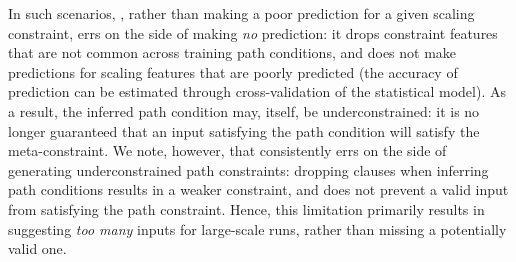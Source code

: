 In such scenarios, \lancet, rather than making a poor prediction for a given scaling constraint, errs on the side of making {\em no} prediction: it drops constraint features that are not common across training path conditions, and does not make predictions for scaling features that are poorly predicted (the accuracy of prediction can be estimated through cross-validation of the statistical model). As a result, the inferred path condition may, itself, be underconstrained: it is no longer guaranteed that an input satisfying the path condition will satisfy the meta-constraint. We note, however, that \lancet consistently errs on the side of generating underconstrained path constraints: dropping clauses when inferring path conditions results in a weaker constraint, and does not prevent a valid input from satisfying the path constraint. Hence, this limitation primarily results in \lancet suggesting {\em too many} inputs for large-scale runs, rather than missing a potentially valid one.
